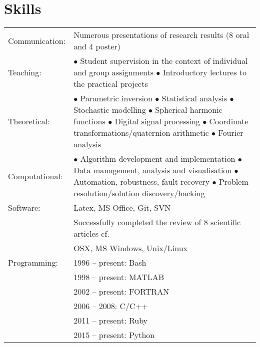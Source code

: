 \documentclass[a4paper]{article}
\newcommand{\dynhref}[2]{%
  \iftoggle{expliciturl}{%
    #2 (\href{#1}{\texttt{\detokenize{#1}}})%
  }{%
    \href{#1}{#2}%
  }%
}
\newcommand{\procv}[2]{\iftoggle{professionalcv}{#1}{#2}}
\newlength{\listskipbig}
\newenvironment{cvsection}[2]{
  \setlength{\floatsep}{0pt}
  \setlength{\textfloatsep}{0pt}
  \setlength{\intextsep}{0pt}
  \section*{#1}
  \begin{longtable}{lp{#2}}
}{
  \end{longtable}
}
\begin{document}

\begin{cvsection}{Skills}{11.2cm}

Communication:  & Numerous presentations of research results (8 oral and 4 poster)\\[\listskipbig]

Teaching:      & $\bullet$ Student supervision in the context of individual and group assignments\newline
                 $\bullet$ Introductory lectures to the practical projects\\[\listskipbig]

Theoretical:   & $\bullet$ Parametric inversion\newline
                 $\bullet$ Statistical analysis\newline
                 $\bullet$ Stochastic modelling\newline
                 $\bullet$ Spherical harmonic functions\newline
                 $\bullet$ Digital signal processing\newline
                 $\bullet$ Coordinate transformations\slash quaternion arithmetic\newline
                 $\bullet$ Fourier analysis\\[\listskipbig]

Computational:  & $\bullet$ Algorithm development and implementation\newline
                  $\bullet$ Data management, analysis and visualisation\newline
                  $\bullet$ Automation, robustness, fault recovery\newline
                  $\bullet$ Problem resolution\slash solution discovery\slash hacking\\[\listskipbig]

Software: & Latex, MS Office, Git, SVN\\[\listskipbig]
\procv{}{
Articles review: & Successfully completed the review of 8 scientific articles cf. \dynhref{https://publons.com/a/782170/}{Publons}\\[\listskipbig]
}

Operating Systems: & OSX, MS Windows, Unix/Linux \\[\listskipbig]

Programming:
& 1996 -- present: Bash \\
& 1998 -- present: MATLAB \\
& 2002 -- present: FORTRAN \\
& 2006 -- 2008: C/C++ \\
& 2011 -- present: Ruby \\
& 2015 -- present: Python\\[\listskipbig]
\end{cvsection}
\end{document}
